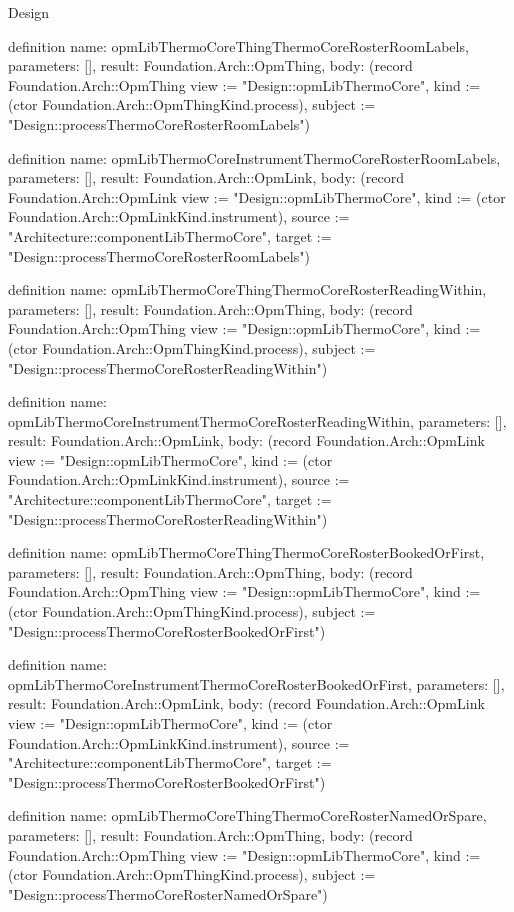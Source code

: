 \begin{lexlean}{Design}
\begin{semanticmodule}
definition{
  name: opmLibThermoCoreThingThermoCoreRosterRoomLabels,
  parameters: [],
  result: Foundation.Arch::OpmThing,
  body: (record Foundation.Arch::OpmThing {view := "Design::opmLibThermoCore", kind := (ctor Foundation.Arch::OpmThingKind.process), subject := "Design::processThermoCoreRosterRoomLabels"})
}

definition{
  name: opmLibThermoCoreInstrumentThermoCoreRosterRoomLabels,
  parameters: [],
  result: Foundation.Arch::OpmLink,
  body: (record Foundation.Arch::OpmLink {view := "Design::opmLibThermoCore", kind := (ctor Foundation.Arch::OpmLinkKind.instrument), source := "Architecture::componentLibThermoCore", target := "Design::processThermoCoreRosterRoomLabels"})
}

definition{
  name: opmLibThermoCoreThingThermoCoreRosterReadingWithin,
  parameters: [],
  result: Foundation.Arch::OpmThing,
  body: (record Foundation.Arch::OpmThing {view := "Design::opmLibThermoCore", kind := (ctor Foundation.Arch::OpmThingKind.process), subject := "Design::processThermoCoreRosterReadingWithin"})
}

definition{
  name: opmLibThermoCoreInstrumentThermoCoreRosterReadingWithin,
  parameters: [],
  result: Foundation.Arch::OpmLink,
  body: (record Foundation.Arch::OpmLink {view := "Design::opmLibThermoCore", kind := (ctor Foundation.Arch::OpmLinkKind.instrument), source := "Architecture::componentLibThermoCore", target := "Design::processThermoCoreRosterReadingWithin"})
}

definition{
  name: opmLibThermoCoreThingThermoCoreRosterBookedOrFirst,
  parameters: [],
  result: Foundation.Arch::OpmThing,
  body: (record Foundation.Arch::OpmThing {view := "Design::opmLibThermoCore", kind := (ctor Foundation.Arch::OpmThingKind.process), subject := "Design::processThermoCoreRosterBookedOrFirst"})
}

definition{
  name: opmLibThermoCoreInstrumentThermoCoreRosterBookedOrFirst,
  parameters: [],
  result: Foundation.Arch::OpmLink,
  body: (record Foundation.Arch::OpmLink {view := "Design::opmLibThermoCore", kind := (ctor Foundation.Arch::OpmLinkKind.instrument), source := "Architecture::componentLibThermoCore", target := "Design::processThermoCoreRosterBookedOrFirst"})
}

definition{
  name: opmLibThermoCoreThingThermoCoreRosterNamedOrSpare,
  parameters: [],
  result: Foundation.Arch::OpmThing,
  body: (record Foundation.Arch::OpmThing {view := "Design::opmLibThermoCore", kind := (ctor Foundation.Arch::OpmThingKind.process), subject := "Design::processThermoCoreRosterNamedOrSpare"})
}


\end{semanticmodule}
\end{lexlean}
